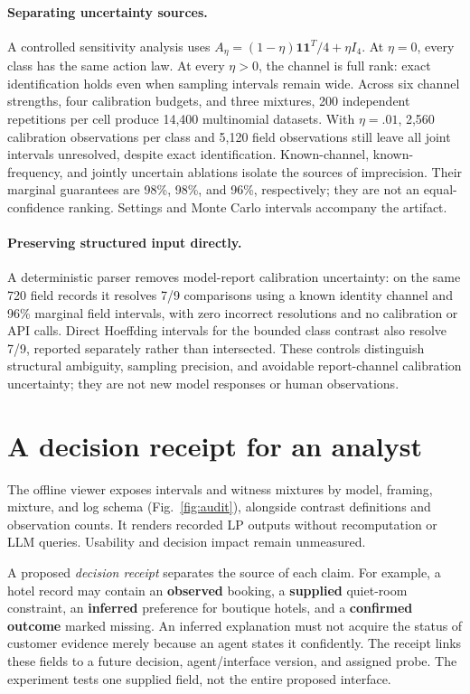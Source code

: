 \documentclass[sigconf,review,anonymous]{acmart}
\begin{document}
\paragraph{Separating uncertainty sources.}
A controlled sensitivity analysis uses $A_\eta=(1-\eta)\mathbf1\mathbf1^T/4+\eta I_4$. At $\eta=0$, every class has the same action law. At every $\eta>0$, the channel is full rank: exact identification holds even when sampling intervals remain wide. Across six channel strengths, four calibration budgets, and three mixtures, 200 independent repetitions per cell produce 14,400 multinomial datasets. With $\eta=.01$, 2,560 calibration observations per class and 5,120 field observations still leave all joint intervals unresolved, despite exact identification. Known-channel, known-frequency, and jointly uncertain ablations isolate the sources of imprecision. Their marginal guarantees are 98\%, 98\%, and 96\%, respectively; they are not an equal-confidence ranking. Settings and Monte Carlo intervals accompany the artifact.

\paragraph{Preserving structured input directly.}
A deterministic parser removes model-report calibration uncertainty: on the same 720 field records it resolves 7/9 comparisons using a known identity channel and 96\% marginal field intervals, with zero incorrect resolutions and no calibration or API calls. Direct Hoeffding intervals for the bounded class contrast also resolve 7/9, reported separately rather than intersected. These controls distinguish structural ambiguity, sampling precision, and avoidable report-channel calibration uncertainty; they are not new model responses or human observations.

\section{A decision receipt for an analyst}
The offline viewer exposes intervals and witness mixtures by model, framing, mixture, and log schema (Fig.~\ref{fig:audit}), alongside contrast definitions and observation counts. It renders recorded LP outputs without recomputation or LLM queries. Usability and decision impact remain unmeasured.

A proposed \emph{decision receipt} separates the source of each claim. For example, a hotel record may contain an \textbf{observed} booking, a \textbf{supplied} quiet-room constraint, an \textbf{inferred} preference for boutique hotels, and a \textbf{confirmed outcome} marked missing. An inferred explanation must not acquire the status of customer evidence merely because an agent states it confidently. The receipt links these fields to a future decision, agent/interface version, and assigned probe. The experiment tests one supplied field, not the entire proposed interface.
\end{document}
